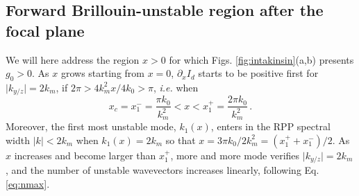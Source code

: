 \documentclass[
 reprint,
 amsmath,amssymb,
 aps,
]{revtex4-1}
\begin{document}
\subsection{Forward Brillouin-unstable region after the focal plane}
We will here address the region $x>0$ for which Figs. \ref{fig:intakinsin}(a,b) presents $g_0>0$.
As $x$ grows starting from  $x=0$,  $\partial_x I_d$ starts to be positive  first for  $\vert k_{y/z} \vert= 2k_m$, if $2\pi>4k_m^2x/4k_0>\pi$, \emph{i.e.} when 
\begin{equation}\label{eq:xc}
x_c=x_1^- = \frac{\pi k_0 }{k_m^2}  <x < x_1^+ = \frac{2\pi k_0 }{k_m^2} \, .
\end{equation}
Moreover, the first most unstable mode, $k_1(x)$, enters in the  RPP spectral width $\vert k \vert< 2k_m$ when $k_1(x)=2k_m$ so that 
$x=3\pi k_0 /2k_m^2=(x_1^++x_1^-)/2$. As $x$ increases and become larger than $x_1^+$, more and more mode verifies $\vert k_{y/z} \vert= 2k_m$, and the number of unstable wavevectors increases linearly, following Eq. \eqref{eq:nmax}.
\end{document}
